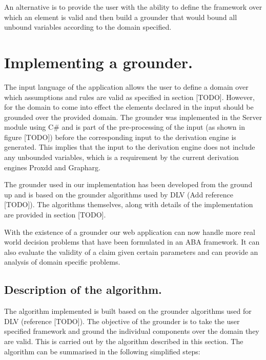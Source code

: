 An alternative is to provide the user with the ability to define the framework over which an element is valid and then build a grounder that would bound all unbound variables according to the domain specified.

\section{Implementing a grounder.}

The input language of the application allows the user to define a domain over which assumptions and rules are valid as specified in section [TODO]. However, for the domain to come into effect the elements declared in the input should be grounded over the provided domain. The grounder was implemented in the Server module using C\# and is part of the pre-processing of the input (as shown in figure [TODO]) before the corresponding input to the derivation engine is generated. This implies that the input to the derivation engine does not include any unbounded variables, which is a requirement by the current derivation engines Proxdd and Grapharg.

The grounder used in our implementation has been developed from the ground up and is based on the grounder algorithms used by DLV (Add reference [TODO]). The algorithms themselves, along with details of the implementation are provided in section [TODO].

With the existence of a grounder our web application can now handle more real world decision problems that have been formulated in an ABA framework. It can also evaluate the validity of a claim given certain parameters and can provide an analysis of domain specific problems.

\subsection{Description of the algorithm.}

The algorithm implemented is built based on the grounder algorithms used for DLV (reference [TODO]). The objective of the grounder is to take the user specified framework and ground the individual components over the domain they are valid. This is carried out by the algorithm described in this section. The algorithm can be summarised in the following simplified steps:

